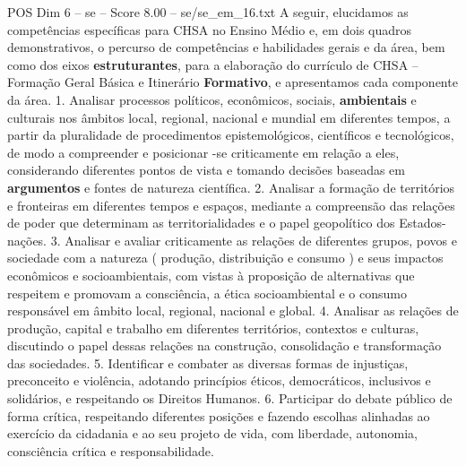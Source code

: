 \begin{textsample}{POS Dim 6 – se – Score 8.00 – se/se\_em\_16.txt}
A seguir, elucidamos as competências específicas para CHSA no Ensino Médio e, em dois quadros demonstrativos, o percurso de competências e habilidades gerais e da área, bem como dos eixos \textbf{estruturantes}, para a elaboração do currículo de CHSA – Formação Geral Básica e Itinerário \textbf{Formativo}, e apresentamos cada componente da área. 1.
Analisar processos políticos, econômicos, sociais, \textbf{ambientais} e culturais nos âmbitos local, regional, nacional e mundial em diferentes tempos, a partir da pluralidade de procedimentos epistemológicos, científicos e tecnológicos, de modo a compreender e posicionar -se criticamente em relação a eles, considerando diferentes pontos de vista e tomando decisões baseadas em \textbf{argumentos} e fontes de natureza científica. 2.
Analisar a formação de territórios e fronteiras em diferentes tempos e espaços, mediante a compreensão das relações de poder que determinam as territorialidades e o papel geopolítico dos Estados-nações. 3.
Analisar e avaliar criticamente as relações de diferentes grupos, povos e sociedade com a natureza ( produção, distribuição e consumo ) e seus impactos econômicos e socioambientais, com vistas à proposição de alternativas que respeitem e promovam a consciência, a ética socioambiental e o consumo responsável em âmbito local, regional, nacional e global. 4.
Analisar as relações de produção, capital e trabalho em diferentes territórios, contextos e culturas, discutindo o papel dessas relações na construção, consolidação e transformação das sociedades. 5.
Identificar e combater as diversas formas de injustiças, preconceito e violência, adotando princípios éticos, democráticos, inclusivos e solidários, e respeitando os Direitos Humanos. 6.
Participar do debate público de forma crítica, respeitando diferentes posições e fazendo escolhas alinhadas ao exercício da cidadania e ao seu projeto de vida, com liberdade, autonomia, consciência crítica e responsabilidade.

\end{textsample}
